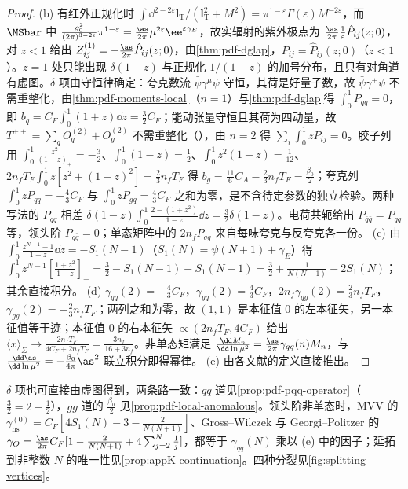 \begin{proof}
(b) 有红外正规化时 $\int\dd^{2-2\varepsilon}\bm l_{\mathrm T}/(\bm l_{\mathrm T}^2+M^2)=\pi^{1-\varepsilon}\Gamma(\varepsilon)M^{-2\varepsilon}$，而 $\MSbar$ 中 $\frac{g_0^2}{(2\pi)^{3-2\varepsilon}}\pi^{1-\varepsilon}=\frac{\as}{2\pi}\mu^{2\varepsilon}\ee^{\varepsilon\gamma_E}$，故实辐射的紫外极点为 $\frac{\as}{2\pi}\frac1\varepsilon\hat P_{ij}(z;0)$，对 $z<1$ 给出 $Z^{(1)}_{ij}=-\frac{\as}{2\pi}\hat P_{ij}(z;0)$，由\cref{thm:pdf-dglap}，$P_{ij}=\hat P_{ij}(z;0)$（$z<1$）。$z=1$ 处只能出现 $\delta(1-z)$ 与正规化 $1/(1-z)$ 的加号分布，且只有对角道有虚图。$\delta$ 项由守恒律确定：夸克数流 $\bar\psi\gamma^\mu\psi$ 守恒，其荷是好量子数，故 $\bar\psi\gamma^+\psi$ 不需重整化，由\cref{thm:pdf-moments-local}（$n=1$）与\cref{thm:pdf-dglap}得 $\int_0^1P_{qq}=0$，即 $b_q=C_F\int_0^1(1+z)\dd z=\frac32C_F$；能动张量守恒且其荷为四动量，故 $T^{++}=\sum_qO^{(2)}_q+O^{(2)}_g$ 不需重整化（\cite{Collins1984}），由 $n=2$ 得 $\sum_i\int_0^1zP_{ij}=0$。胶子列用 $\int_0^1\frac{z^2}{(1-z)_+}=-\frac32$、$\int_0^1(1-z)=\frac12$、$\int_0^1z^2(1-z)=\frac1{12}$、$2n_fT_F\int_0^1z[z^2+(1-z)^2]=\frac23n_fT_F$ 得 $b_g=\frac{11}6C_A-\frac23n_fT_F=\frac{\beta_0}2$；夸克列 $\int_0^1zP_{qq}=-\frac43C_F$ 与 $\int_0^1zP_{gq}=\frac43C_F$ 之和为零，是不含待定参数的独立检验。两种写法的 $P_{qq}$ 相差 $\delta(1-z)\int_0^1\frac{2-(1+z^2)}{1-z}\dd z=\frac32\delta(1-z)$。电荷共轭给出 $P_{\bar q\bar q}=P_{qq}$ 等，领头阶 $P_{q\bar q}=0$；单态矩阵中的 $2n_fP_{qg}$ 来自每味夸克与反夸克各一份。
(c) 由 $\int_0^1\frac{z^{N-1}-1}{1-z}\dd z=-S_1(N-1)$（$S_1(N)=\psi(N+1)+\gamma_E$）得 $\int_0^1z^{N-1}[\frac{1+z^2}{1-z}]_+=\frac32-S_1(N-1)-S_1(N+1)=\frac32+\frac{1}{N(N+1)}-2S_1(N)$；其余直接积分。
(d) $\gamma_{qq}(2)=-\frac43C_F$，$\gamma_{gq}(2)=\frac43C_F$，$2n_f\gamma_{qg}(2)=\frac23n_fT_F$，$\gamma_{gg}(2)=-\frac23n_fT_F$；两列之和为零，故 $(1,1)$ 是本征值 $0$ 的左本征矢，另一本征值等于迹；本征值 $0$ 的右本征矢 $\propto(2n_fT_F,4C_F)$ 给出 $\langle x\rangle_\Sigma\to\frac{2n_fT_F}{4C_F+2n_fT_F}=\frac{3n_f}{16+3n_f}$。非单态矩满足 $\frac{\dd M_n}{\dd\ln\mu^2}=\frac{\as}{2\pi}\gamma_{qq}(n)M_n$，与 $\frac{\dd\as}{\dd\ln\mu^2}=-\frac{\beta_0}{4\pi}\as^2$ 联立积分即得幂律。
(e) 由各文献的定义直接推出。
\end{proof}

$\delta$ 项也可直接由虚图得到，两条路一致：$qq$ 道见\cref{prop:pdf-pqq-operator}（$\frac32=2-\frac12$），$gg$ 道的 $\frac{\beta_0}2$ 见\cref{prop:pdf-local-anomalous}。领头阶非单态时，MVV 的 $\gamma^{(0)}_{\mathrm{ns}}=C_F[4S_1(N)-3-\frac{2}{N(N+1)}]$\cite{MochVermaserenVogt2004}、Gross--Wilczek 与 Georgi--Politzer 的 $\gamma_O=\frac{\as}{2\pi}C_F[1-\frac{2}{N(N+1)}+4\sum_{j=2}^N\frac1j]$\cite{GrossWilczek1974,GeorgiPolitzer1974}，都等于 $\gamma_{qq}(N)$ 乘以 (e) 中的因子；延拓到非整数 $N$ 的唯一性见\cref{prop:appK-continuation}。四种分裂见\cref{fig:splitting-vertices}。


